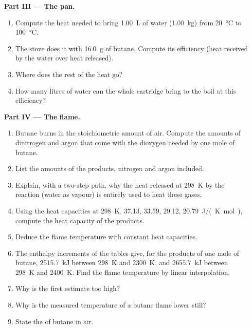 \begin{problem}
\medskip
\noindent\textbf{Part III --- The pan.}
\begin{enumerate}[resume]
  \item Compute the heat needed to bring \qty{1.00}{L} of water
        (\qty{1.00}{kg}) from \qty{20}{\celsius} to \qty{100}{\celsius}.
  \item The stove does it with \qty{16.0}{g} of butane. Compute its
        efficiency (heat received by the water over heat released).
  \item Where does the rest of the heat go?
  \item How many litres of water can the whole cartridge bring to the boil
        at this efficiency?
\end{enumerate}

\medskip
\noindent\textbf{Part IV --- The flame.}
\begin{enumerate}[resume]
  \item Butane burns in the stoichiometric amount of air. Compute the
        amounts of dinitrogen and argon that come with the dioxygen needed
        by one mole of butane.
  \item List the amounts of the products, nitrogen and argon included.
  \item Explain, with a two-step path, why the heat released at
        \qty{298}{K} by the reaction (water as vapour) is entirely used to
        heat these gases.
  \item Using the heat capacities at \qty{298}{K},  37.13,
         33.59,  29.12,  \qty{20.79}{J/(K.mol)},
        compute the heat capacity of the products.
  \item Deduce the flame temperature with constant heat capacities.
  \item The enthalpy increments of the tables give, for the products of one
        mole of butane, \qty{2515.7}{kJ} between \qty{298}{K} and
        \qty{2300}{K}, and \qty{2655.7}{kJ} between \qty{298}{K} and
        \qty{2400}{K}. Find the flame temperature by linear interpolation.
  \item Why is the first estimate too high?
  \item Why is the measured temperature of a butane flame lower still?
  \item State the  of butane in air.
\end{enumerate}
\end{problem}
